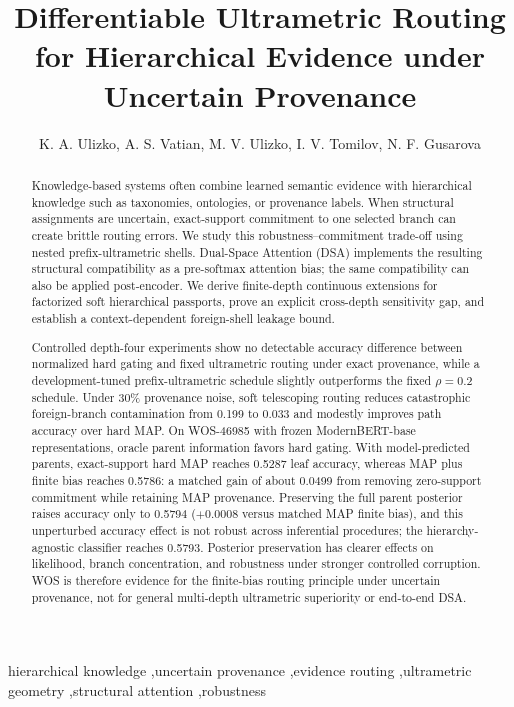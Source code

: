 \documentclass[preprint,11pt]{elsarticle}
\begin{document}
\begin{frontmatter}

\title{Differentiable Ultrametric Routing for Hierarchical Evidence under Uncertain Provenance}
\author{K. A. Ulizko, A. S. Vatian, M. V. Ulizko, I. V. Tomilov, N. F. Gusarova}

\begin{abstract}
Knowledge-based systems often combine learned semantic evidence with hierarchical knowledge such as taxonomies, ontologies, or provenance labels. When structural assignments are uncertain, exact-support commitment to one selected branch can create brittle routing errors. We study this robustness--commitment trade-off using nested prefix-ultrametric shells. Dual-Space Attention (DSA) implements the resulting structural compatibility as a pre-softmax attention bias; the same compatibility can also be applied post-encoder. We derive finite-depth continuous extensions for factorized soft hierarchical passports, prove an explicit cross-depth sensitivity gap, and establish a context-dependent foreign-shell leakage bound.

Controlled depth-four experiments show no detectable accuracy difference between normalized hard gating and fixed ultrametric routing under exact provenance, while a development-tuned prefix-ultrametric schedule slightly outperforms the fixed $\rho=0.2$ schedule. Under 30\% provenance noise, soft telescoping routing reduces catastrophic foreign-branch contamination from 0.199 to 0.033 and modestly improves path accuracy over hard MAP. On WOS-46985 with frozen ModernBERT-base representations, oracle parent information favors hard gating. With model-predicted parents, exact-support hard MAP reaches 0.5287 leaf accuracy, whereas MAP plus finite bias reaches 0.5786: a matched gain of about 0.0499 from removing zero-support commitment while retaining MAP provenance. Preserving the full parent posterior raises accuracy only to 0.5794 ($+0.0008$ versus matched MAP finite bias), and this unperturbed accuracy effect is not robust across inferential procedures; the hierarchy-agnostic classifier reaches 0.5793. Posterior preservation has clearer effects on likelihood, branch concentration, and robustness under stronger controlled corruption. WOS is therefore evidence for the finite-bias routing principle under uncertain provenance, not for general multi-depth ultrametric superiority or end-to-end DSA.
\end{abstract}

\begin{keyword}
hierarchical knowledge \sep uncertain provenance \sep evidence routing \sep ultrametric geometry \sep structural attention \sep robustness
\end{keyword}
\end{frontmatter}
\end{document}
